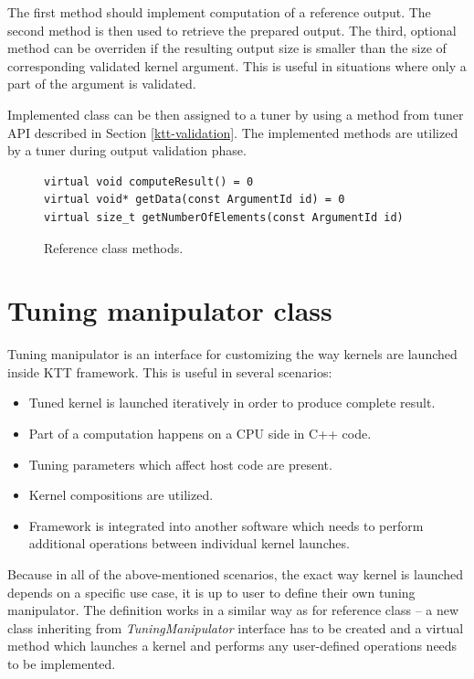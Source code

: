 \documentclass
[
    digital, %
    oneside, %
    table, %
    nolof, %
    nolot, %
    nocover %
]{fithesis3}
\begin{document}
The first method should implement computation of a reference output. The second method is then used to retrieve the prepared output. The third, optional
method can be overriden if the resulting output size is smaller than the size of corresponding validated kernel argument. This is useful in situations
where only a part of the argument is validated.

Implemented class can be then assigned to a tuner by using a method from tuner API described in Section \ref{ktt-validation}. The implemented
methods are utilized by a tuner during output validation phase.

\begin{figure}
\begin{adjustwidth}{-1cm}{-1cm}
\begin{lstlisting}
virtual void computeResult() = 0
virtual void* getData(const ArgumentId id) = 0
virtual size_t getNumberOfElements(const ArgumentId id)
\end{lstlisting}
\caption{Reference class methods.}
\label{ktt-reference-methods}
\end{adjustwidth}
\end{figure}

\section{Tuning manipulator class}
\label{ktt-manipulator}
Tuning manipulator is an interface for customizing the way kernels are launched inside KTT framework. This is useful in several scenarios:
\begin{itemize}
    \item Tuned kernel is launched iteratively in order to produce complete result.
    \item Part of a computation happens on a CPU side in C++ code.
    \item Tuning parameters which affect host code are present.
    \item Kernel compositions are utilized.
    \item Framework is integrated into another software which needs to perform additional operations between individual kernel launches.
\end{itemize}

Because in all of the above-mentioned scenarios, the exact way kernel is launched depends on a specific use case, it is up to user to define their own
tuning manipulator. The definition works in a similar way as for reference class -- a new class inheriting from \textit{TuningManipulator} interface
has to be created and a virtual method which launches a kernel and performs any user-defined operations needs to be implemented.
\end{document}
